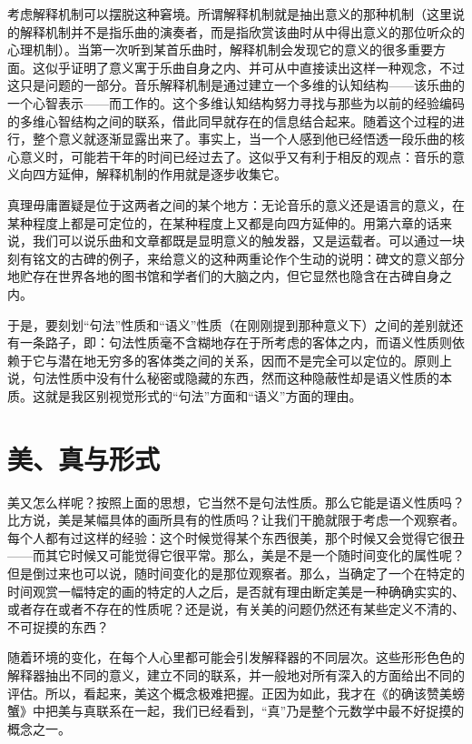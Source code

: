 考虑解释机制可以摆脱这种窘境。所谓解释机制就是抽出意义的那种机制（这里说的解释机制并不是指乐曲的演奏者，而是指欣赏该曲时从中得出意义的那位听众的心理机制）。当第一次听到某首乐曲时，解释机制会发现它的意义的很多重要方面。这似乎证明了意义寓于乐曲自身之内、并可从中直接读出这样一种观念，不过这只是问题的一部分。音乐解释机制是通过建立一个多维的认知结构——该乐曲的一个心智表示——而工作的。这个多维认知结构努力寻找与那些为以前的经验编码的多维心智结构之间的联系，借此同早就存在的信息结合起来。随着这个过程的进行，整个意义就逐渐显露出来了。事实上，当一个人感到他已经悟透一段乐曲的核心意义时，可能若干年的时间已经过去了。这似乎又有利于相反的观点：音乐的意义向四方延伸，解释机制的作用就是逐步收集它。

真理毋庸置疑是位于这两者之间的某个地方：无论音乐的意义还是语言的意义，在某种程度上都是可定位的，在某种程度上又都是向四方延伸的。用第六章的话来说，我们可以说乐曲和文章都既是显明意义的触发器，又是运载者。可以通过一块刻有铭文的古碑的例子，来给意义的这种两重论作个生动的说明：碑文的意义部分地贮存在世界各地的图书馆和学者们的大脑之内，但它显然也隐含在古碑自身之内。

于是，要刻划“句法”性质和“语义”性质（在刚刚提到那种意义下）之间的差别就还有一条路子，即：句法性质毫不含糊地存在于所考虑的客体之内，而语义性质则依赖于它与潜在地无穷多的客体类之间的关系，因而不是完全可以定位的。原则上说，句法性质中没有什么秘密或隐藏的东西，然而这种隐蔽性却是语义性质的本质。这就是我区别视觉形式的“句法”方面和“语义”方面的理由。

\section{美、真与形式}

美又怎么样呢？按照上面的思想，它当然不是句法性质。那么它能是语义性质吗？比方说，美是某幅具体的画所具有的性质吗？让我们干脆就限于考虑一个观察者。每个人都有过这样的经验：这个时候觉得某个东西很美，那个时候又会觉得它很丑——而其它时候又可能觉得它很平常。那么，美是不是一个随时间变化的属性呢？但是倒过来也可以说，随时间变化的是那位观察者。那么，当确定了一个在特定的时间观赏一幅特定的画的特定的人之后，是否就有理由断定美是一种确确实实的、或者存在或者不存在的性质呢？还是说，有关美的问题仍然还有某些定义不清的、不可捉摸的东西？

随着环境的变化，在每个人心里都可能会引发解释器的不同层次。这些形形色色的解释器抽出不同的意义，建立不同的联系，并一般地对所有深入的方面给出不同的评估。所以，看起来，美这个概念极难把握。正因为如此，我才在《的确该赞美螃蟹》中把美与真联系在一起，我们已经看到，“真”乃是整个元数学中最不好捉摸的概念之一。

